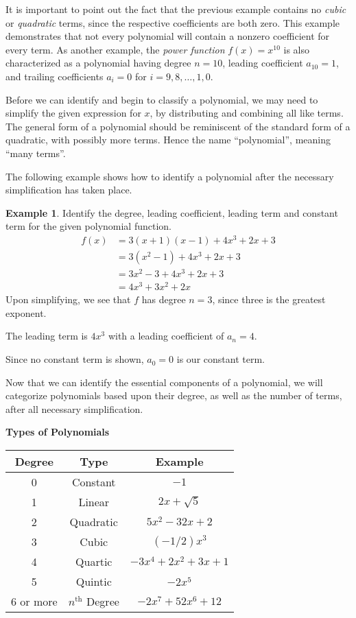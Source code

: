 \documentclass[12pt]{book}
\theoremstyle{definition}
\newtheorem{example}{Example}
\begin{document}
It is important to point out the fact that the previous example contains no {\it cubic} or {\it quadratic} terms, since the respective coefficients are both zero.  This example demonstrates that not every polynomial will contain a nonzero coefficient for every term.  As another example, the {\it power function} $f(x)=x^{10}$ is also characterized as a polynomial having degree $n=10$, leading coefficient $a_{10}=1$, and trailing coefficients $a_i=0$ for $i=9,8,\ldots,1,0$.
\par
Before we can identify and begin to classify a polynomial, we may need to simplify the given expression for $x$, by distributing and combining all like terms.  The general form of a polynomial should be reminiscent of the standard form of a quadratic, with possibly more terms.  Hence the name ``polynomial'', meaning ``many terms''.
\par
The following example shows how to identify a polynomial after the necessary simplification has taken place.
\begin{example} Identify the degree, leading coefficient, leading term and constant term for the given polynomial function.
\begin{equation*}
\begin{split}
f(x) &= 3(x+1)(x-1)+4x^3+2x+3\\
& = 3(x^2-1)+4x^3+2x+3\\
& = 3x^2-3+4x^3+2x+3\\
& = 4x^3+3x^2+2x
\end{split}
\end{equation*}
Upon simplifying, we see that $f$ has degree $n=3$, since three is the greatest exponent.
\par
The leading term is $4x^3$ with a leading coefficient of $a_n=4$.
\par
Since no constant term is shown, $a_0=0$ is our constant term.
\end{example}
Now that we can identify the essential components of a polynomial, we will categorize polynomials based upon their degree, as well as the number of terms, after all necessary simplification.
\newpage
\begin{center}
{\bf Types of Polynomials}
\par
\begin{tabular}{ | c | c | c | } 
\hline
Degree & Type & Example \\ 
\hline
0 & Constant & $-1$ \\ 
\hline
1 & Linear & $2x+\sqrt{5}$ \\ 
\hline
2 & Quadratic & $5x^2 - 32x+2$ \\ 
\hline
3 & Cubic & $(-1/2)x^{3}$ \\ 
\hline
4 & Quartic & $-3x^{4} +2x^2+3x + 1$ \\ 
\hline
5  & Quintic & $-2x^5$ \\ 
\hline
6 or more  & $n^{\text{th}}$ Degree & $-2x^{7} + 52x^6 + 12$ \\ 
\hline
\end{tabular}
\end{center}
\end{document}

